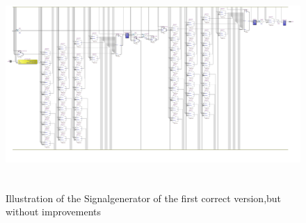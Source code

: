 \begin{figure}[h]
\centering
\includegraphics[width=650px,height=300px,angle=-90]{../../pictures/20.02.2014/signalgenerator_signalgenerator_top.jpg}
\caption[Signalgenerator of the First Version]{Illustration of the Signalgenerator of the first correct version,but without improvements}
\label{fig:version:one:sig}
\end{figure}
